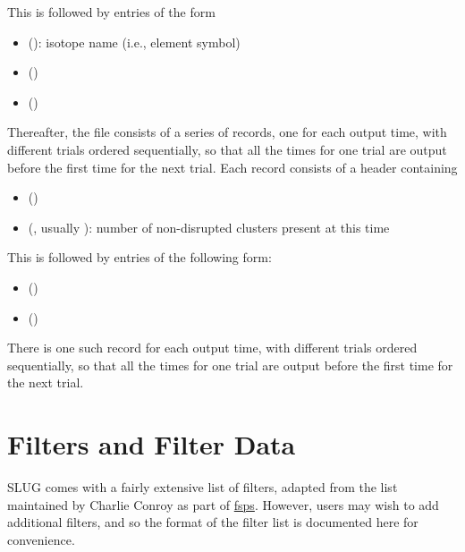 \documentclass[letterpaper,10pt,english]{sphinxmanual}
\begin{document}
This is followed by  entries of the form
\begin{itemize}
\item {} 
 (): isotope name (i.e., element symbol)

\item {} 
 ()

\item {} 
 ()

\end{itemize}

Thereafter, the file consists of a series of records, one for each output time, with different trials ordered sequentially, so that all the times for one trial are output before the first time for the next trial. Each record consists of a header containing
\begin{itemize}
\item {} 
 ()

\item {} 
 (, usually ): number of non-disrupted clusters present at this time

\end{itemize}

This is followed by  entries of the following form:
\begin{itemize}
\item {} 
 ()

\item {} 
 ()

\end{itemize}

There is one such record for each output time, with different trials
ordered sequentially, so that all the times for one trial are output
before the first time for the next trial.


\chapter{Filters and Filter Data}
\label{filters:sec-filters}\label{filters::doc}\label{filters:filters-and-filter-data}
SLUG comes with a fairly extensive list of filters, adapted from the list maintained by Charlie Conroy as part of \href{https://code.google.com/p/fsps/}{fsps}. However, users may wish to add additional filters, and so the format of the filter list is documented here for convenience.
\end{document}
